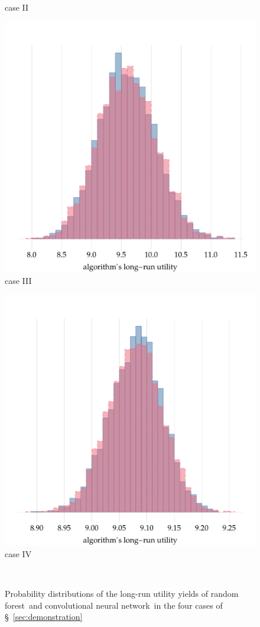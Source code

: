 \documentclass[\ifafour a4paper,12pt,\else a5paper,10pt,\fi%
onecolumn,oneside,article,%
british%
]{memoir}
\theoremstyle{remark}
\theoremstyle{innote}
\renewcommand*{\|}[1][]{\nonscript\:#1\vert\nonscript\:\mathopen{}}
\newcommand*{\sect}{\S}%
\newcommand*{\RF}{random forest}
\newcommand*{\CNN}{convolutional neural network}
\begin{document}
\begin{figure}[!p]
{    \\ case II}
  \\[\jot]
  \parbox{0.495\linewidth}{\centering
    \includegraphics[width=\linewidth]{histogram_alg_utilities_3.pdf}
  \\ case III}%
  \hfill
  \parbox{0.495\linewidth}{\centering
    \includegraphics[width=\linewidth]{histogram_alg_utilities_4.pdf}
  \\ case IV}
\\
  \caption{Probability distributions of the long-run utility yields of \RF\ and \CNN\ in the four cases of \sect~\ref{sec:demonstration}}
  \label{fig:algorithms_utilities_histograms}
\end{figure}
\end{document}
